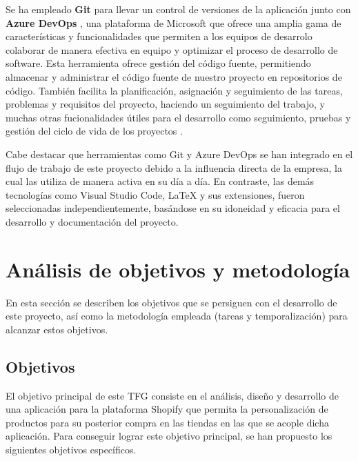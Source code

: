 \documentclass[12pt]{article}
\begin{document}
Se ha empleado \textbf{Git} \cite{git} para llevar un control de versiones de la aplicación junto con \textbf{Azure DevOps} \cite{azure-devops}, una plataforma de Microsoft que ofrece una amplia
gama de características y funcionalidades que permiten a los equipos de desarrolo colaborar de manera efectiva en equipo y optimizar el proceso de desarrollo
de software. Esta herramienta ofrece gestión del código fuente, permitiendo almacenar y administrar el código fuente de nuestro proyecto en 
repositorios de código. También facilita la planificación, asignación y seguimiento de las tareas, problemas y requisitos del proyecto, haciendo
un seguimiento del trabajo, y muchas otras fucionalidades útiles para el desarrollo como seguimiento, pruebas y gestión del ciclo de vida de los proyectos \cite{devOps}. 

Cabe destacar que herramientas como Git y Azure DevOps se han integrado en el flujo de trabajo de este proyecto debido a la influencia directa de la empresa, la cual las 
utiliza de manera activa en su día a día. En contraste, las demás tecnologías como Visual Studio Code, LaTeX y sus extensiones, fueron seleccionadas 
independientemente, basándose en su idoneidad y eficacia para el desarrollo y documentación del proyecto.

\clearpage
\section{Análisis de objetivos y metodología}
En esta sección se describen los objetivos que se persiguen con el desarrollo de este proyecto, así como la metodología empleada (tareas y temporalización) para alcanzar estos objetivos.

\subsection{Objetivos}

El objetivo principal de este TFG consiste en el análisis, diseño y desarrollo de una aplicación para la plataforma Shopify que permita
la personalización de productos para su posterior compra en las tiendas en las que se acople dicha aplicación. Para conseguir lograr este objetivo 
principal, se han propuesto los siguientes objetivos específicos.
\end{document}
